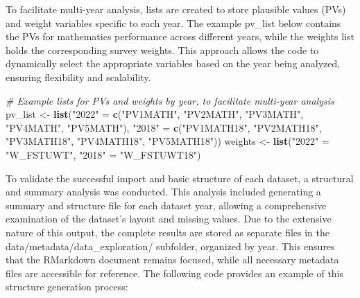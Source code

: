 \documentclass[
]{article}
\newenvironment{Shaded}{\begin{snugshade}}{\end{snugshade}}
\newcommand{\CommentTok}[1]{\textcolor[rgb]{0.56,0.35,0.01}{\textit{#1}}}
\newcommand{\FunctionTok}[1]{\textcolor[rgb]{0.13,0.29,0.53}{\textbf{#1}}}
\newcommand{\NormalTok}[1]{#1}
\newcommand{\OtherTok}[1]{\textcolor[rgb]{0.56,0.35,0.01}{#1}}
\newcommand{\StringTok}[1]{\textcolor[rgb]{0.31,0.60,0.02}{#1}}
\begin{document}
To facilitate multi-year analysis, lists are created to store plausible
values (PVs) and weight variables specific to each year. The example
pv\_list below contains the PVs for mathematics performance across
different years, while the weights list holds the corresponding survey
weights. This approach allows the code to dynamically select the
appropriate variables based on the year being analyzed, ensuring
flexibility and scalability.

\begin{Shaded}
\begin{Highlighting}[]
\CommentTok{\# Example lists for PVs and weights by year, to facilitate multi{-}year analysis}
\NormalTok{pv\_list }\OtherTok{\textless{}{-}} \FunctionTok{list}\NormalTok{(}\StringTok{"2022"} \OtherTok{=} \FunctionTok{c}\NormalTok{(}\StringTok{"PV1MATH"}\NormalTok{, }\StringTok{"PV2MATH"}\NormalTok{, }\StringTok{"PV3MATH"}\NormalTok{, }\StringTok{"PV4MATH"}\NormalTok{, }\StringTok{"PV5MATH"}\NormalTok{),}
                \StringTok{"2018"} \OtherTok{=} \FunctionTok{c}\NormalTok{(}\StringTok{"PV1MATH18"}\NormalTok{, }\StringTok{"PV2MATH18"}\NormalTok{, }\StringTok{"PV3MATH18"}\NormalTok{, }\StringTok{"PV4MATH18"}\NormalTok{, }\StringTok{"PV5MATH18"}\NormalTok{))}
\NormalTok{weights }\OtherTok{\textless{}{-}} \FunctionTok{list}\NormalTok{(}\StringTok{"2022"} \OtherTok{=} \StringTok{"W\_FSTUWT"}\NormalTok{, }\StringTok{"2018"} \OtherTok{=} \StringTok{"W\_FSTUWT18"}\NormalTok{)}
\end{Highlighting}
\end{Shaded}

To validate the successful import and basic structure of each dataset, a
structural and summary analysis was conducted. This analysis included
generating a summary and structure file for each dataset year, allowing
a comprehensive examination of the dataset's layout and missing values.
Due to the extensive nature of this output, the complete results are
stored as separate files in the data/metadata/data\_exploration/
subfolder, organized by year. This ensures that the RMarkdown document
remains focused, while all necessary metadata files are accessible for
reference. The following code provides an example of this structure
generation process:
\end{document}
